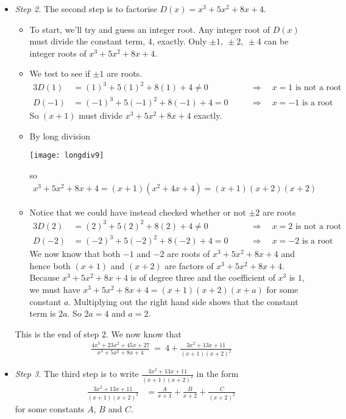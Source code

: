 \begin{eg}
\begin{itemize}
\item \emph{Step 2.}
 The second step is to factorise $D(x)=x^3+5x^2+8x+4$.
\begin{itemize}
 \item To start, we'll try and guess an integer root.
Any integer root of $D(x)$ must divide the constant term, $4$, exactly.
Only $\pm 1,\ \pm2,\ \pm4$ can be integer roots of  $x^3+5x^2+8x+4$.
\item We test to see if $\pm 1$ are roots.
\begin{alignat*}{3}
D(1)&=(1)^3+5(1)^2+8(1)+4\ne 0&&\Rightarrow\quad\text{$x=1$ is not a root}\\
D(-1)&=(-1)^3+5(-1)^2+8(-1)+4= 0\quad&&\Rightarrow
                   \quad\text{$x=-1$ is  a root}
\end{alignat*}
So $(x+1)$ must divide $x^3+5x^2+8x+4$ exactly.
\item By long division
\begin{center}
\texttt{[image: longdiv9]}
\end{center}
so
\begin{align*}
x^3+5x^2+8x+4=(x+1)(x^2+4x+4)=(x+1)(x+2)(x+2)
\end{align*}
\item Notice that we could have instead checked whether or not $\pm 2$ are roots
\begin{alignat*}{3}
D(2)&=(2)^3+5(2)^2+8(2)+4\ne 0&&\Rightarrow\quad\text{$x=2$ is not a root}\\
D(-2)&=(-2)^3+5(-2)^2+8(-2)+4= 0\quad&&\Rightarrow
                   \quad\text{$x=-2$ is  a root}
\end{alignat*}
We now know that both $-1$ and $-2$ are roots of $x^3 + 5x^2 + 8x + 4$ and hence both
$(x+1)$ and $(x+2)$ are factors of  $x^3 + 5x^2 + 8x + 4$. Because $x^3 + 5x^2 + 8x + 4$
is of degree three and the coefficient of $x^3$ is $1$, we must have $x^3 + 5x^2 + 8x + 4
= (x+1)(x+2)(x+a)$ for some constant $a$. Multiplying out the right hand side shows that
the constant term is $2a$. So $2a=4$ and $a=2$.
\end{itemize}
This is the end of step 2. We now know that
\begin{align*}
\frac{4x^3+23x^2+45x+27}{x^3+5x^2+8x+4}
\ =\ 4+\frac{3x^2+13x+11}{(x+1)(x+2)^2}
\end{align*}

\item \emph{Step 3.}
 The third step is to write $\frac{3x^2+13x+11}{(x+1)(x+2)^2}$
in the form
\begin{align*}
\frac{3x^2+13x+11}{(x+1)(x+2)^2}
&= \frac{A}{x+1}+\frac{B}{x+2}+\frac{C}{(x+2)^2}
\end{align*}
for some constants $A$, $B$ and $C$.



\end{itemize}
\end{eg}
